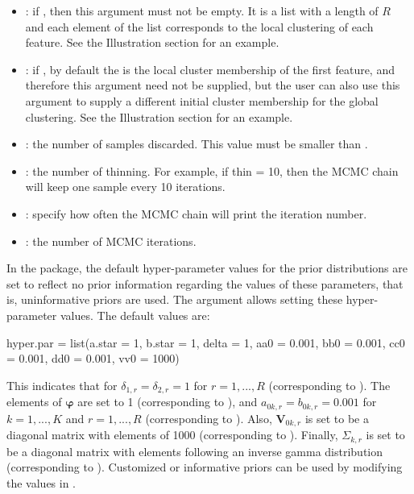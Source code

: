 \begin{itemize}
	\item  {}: if  , then this argument must not be empty. It is a list with a length of $R$ and each element of the list corresponds to the local clustering of each feature. See the Illustration section for an example.
	\item  {}: if  , by default the  is the local cluster membership of the first feature, and therefore this argument need not be supplied, but the user can also use this argument to supply a different initial cluster membership for the global clustering. See the Illustration section for an example.
	\item  {}: the number of samples discarded. This value must be smaller than .
	\item  {}: the number of thinning. For example, if thin = 10, then the MCMC chain will keep one sample every 10 iterations. 
	\item  {}: specify how often the MCMC chain will print the iteration number. 
	\item  {}: the number of MCMC iterations. 
\end{itemize}
In the  package, the default hyper-parameter values for the prior distributions are set to reflect no prior information regarding the values of these parameters, that is, uninformative priors are used. The argument  allows setting these hyper-parameter values. The default values are: 
\begin{example}
hyper.par = list(a.star = 1, b.star = 1, delta = 1, 
		       aa0 = 0.001, bb0 = 0.001, cc0 = 0.001, dd0 = 0.001,  
			  vv0 = 1000)
\end{example}
This indicates that for $\delta_{1,r} = \delta_{2,r} = 1$ for $r = 1,...,R$ (corresponding to ). The elements of $\boldsymbol{\varphi}$ are set to 1 (corresponding to ), and $a_{0k,r} = b_{0k,r} = 0.001 $ for $k = 1,...,K$ and $r = 1,...,R$ (corresponding to ).  Also, $\boldsymbol{V}_{0k,r}$ is set to be a diagonal matrix with elements of 1000 (corresponding to ). Finally, $\Sigma_{k,r}$ is set to be a diagonal matrix with elements following an inverse gamma distribution (corresponding to ). Customized or informative priors can be used by modifying the values in .
